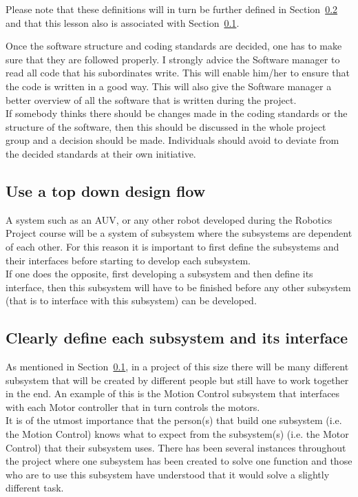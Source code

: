 Please note that these definitions will in turn be further defined in Section~\ref{sec:define} and that this lesson also is associated with Section~\ref{sec:top_down}.

Once the software structure and coding standards are decided, one has to make sure that they are followed properly. I strongly advice the Software manager to read all code that his subordinates write. This will enable him/her to ensure that the code is written in a good way. This will also give the Software manager a better overview of all the software that is written during the project. \\
If somebody thinks there should be changes made in the coding standards or the structure of the software, then this should be discussed in the whole project group and a decision should be made. Individuals should avoid to deviate from the decided standards at their own initiative.


\subsection{Use a top down design flow}\label{sec:top_down}
A system such as an AUV, or any other robot developed during the Robotics Project course will be a system of subsystem where the subsystems are dependent of each other. For this reason it is important to first define the subsystems and their interfaces before starting to develop each subsystem. \\
If one does the opposite, first developing a subsystem and then define its interface, then this subsystem will have to be finished before any other subsystem (that is to interface with this subsystem) can be developed. 



\subsection{Clearly define each subsystem and its interface}\label{sec:define}
As mentioned in Section~\ref{sec:top_down}, in a project of this size there will be many different subsystem that will be created by different people but still have to work together in the end. An example of this is the Motion Control subsystem that interfaces with each Motor controller that in turn controls the motors. \\
It is of the utmost importance that the person(s) that build one subsystem (i.e. the Motion Control) knows what to expect from the subsystem(s) (i.e. the Motor Control) that their subsystem uses. There has been several instances throughout the project where one subsystem has been created to solve one function and those who are to use this subsystem have understood that it would solve a slightly different task. 

